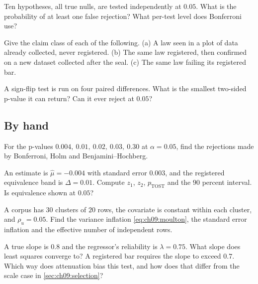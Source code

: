 \begin{exercise}\label{exr:ch09:bonf}
Ten hypotheses, all true nulls, are tested independently at $0.05$. What is the probability of at least one false rejection? What per-test level does Bonferroni use?
\end{exercise}

\begin{exercise}\label{exr:ch09:tags}
Give the claim class of each of the following. (a) A law seen in a plot of data already collected, never registered. (b) The same law registered, then confirmed on a new dataset collected after the seal. (c) The same law failing its registered bar.
\end{exercise}

\begin{exercise}\label{exr:ch09:minp}
A sign-flip test is run on four paired differences. What is the smallest two-sided p-value it can return? Can it ever reject at $0.05$?
\end{exercise}

\subsection*{By hand}

\begin{exercise}\label{exr:ch09:holmbh}
For the p-values $0.004,\ 0.01,\ 0.02,\ 0.03,\ 0.30$ at $\alpha=0.05$, find the rejections made by Bonferroni, Holm and Benjamini--Hochberg.
\end{exercise}

\begin{exercise}\label{exr:ch09:tost}
An estimate is $\hat\mu=-0.004$ with standard error $0.003$, and the registered equivalence band is $\Delta=0.01$. Compute $z_1$, $z_2$, $p_{\text{TOST}}$ and the $90$ percent interval. Is equivalence shown at $0.05$?
\end{exercise}

\begin{exercise}\label{exr:ch09:de}
A corpus has $30$ clusters of $20$ rows, the covariate is constant within each cluster, and $\rho_u=0.05$. Find the variance inflation \eqref{eq:ch09:moulton}, the standard error inflation and the effective number of independent rows.
\end{exercise}

\begin{exercise}\label{exr:ch09:atten}
A true slope is $0.8$ and the regressor's reliability is $\lambda=0.75$. What slope does least squares converge to? A registered bar requires the slope to exceed $0.7$. Which way does attenuation bias this test, and how does that differ from the scale case in \cref{sec:ch09:selection}?
\end{exercise}

